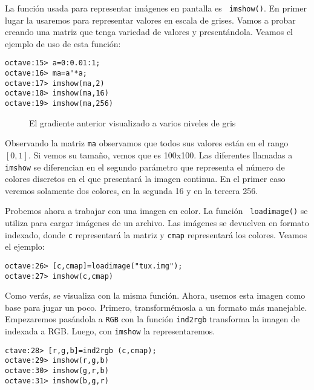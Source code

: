 La  función  usada  para  representar imágenes  en  pantalla  es  {\tt
imshow()}. En  primer lugar  la usaremos  para representar  valores en
escala de grises. Vamos a probar creando una matriz que tenga variedad
de valores y presentándola. Veamos el ejemplo de uso de esta función:

\begin{verbatim}
octave:15> a=0:0.01:1;
octave:16> ma=a'*a;
octave:17> imshow(ma,2)
octave:18> imshow(ma,16)
octave:19> imshow(ma,256)
\end{verbatim}

\begin{figure}[htbp]
\centering
{}
\caption[Gradiente visualizado a varios niveles de gris]%
{El gradiente anterior visualizado a varios niveles de gris}
\end{figure}

Observando la matriz  {\tt ma} observamos que todos  sus valores están
en el  rango $[0,1]$. Si  vemos su tamaño,  vemos que es  100x100. Las
diferentes  llamadas  a {\tt  imshow}  se  diferencian en  el  segundo
parámetro  que representa  el número  de colores  discretos en  el que
presentará la imagen continua. En el primer caso veremos solamente dos
colores, en la segunda 16 y en la tercera 256.

Probemos ahora  a trabajar con  una imagen  en color. La  función {\tt
loadimage()}  se  utiliza para  cargar  imágenes  de un  archivo.  Las
imágenes se devuelven en formato  indexado, donde {\tt c} representará
la matriz y {\tt cmap} representará los colores. Veamos el ejemplo:

\begin{verbatim}
octave:26> [c,cmap]=loadimage("tux.img");
octave:27> imshow(c,cmap)
\end{verbatim}

Como  verás, se  visualiza con  la misma  función. Ahora,  usemos esta
imagen como  base para  jugar un poco.  Primero, transformémosla  a un
formato  más  manejable. Empezaremos  pasándola  a  {\tt RGB}  con  la
función {\tt ind2rgb}  transforma la imagen de indexada  a RGB. Luego,
con {\tt imshow} la representaremos.

\begin{verbatim}
ctave:28> [r,g,b]=ind2rgb (c,cmap);
octave:29> imshow(r,g,b)
octave:30> imshow(g,r,b)
octave:31> imshow(b,g,r)
\end{verbatim}

